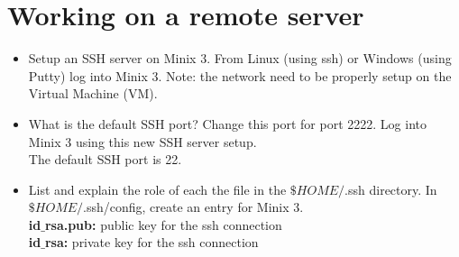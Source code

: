 \documentclass{article}
\begin{document}
\section{Working on a remote server}
\begin{itemize}
\item Setup an SSH server on Minix 3. From Linux (using ssh) or Windows (using Putty) log into Minix 3. Note: the network need to be properly setup on the Virtual Machine (VM).\\
\item What is the default SSH port? Change this port for port 2222. Log into Minix 3 using this new SSH server setup.\\
The default SSH port is 22.\\
\item List and explain the role of each the file in the $\$HOME/$.ssh directory. In $\$HOME/$.ssh/config, create an entry for Minix 3.\\
\textbf{id$\_$rsa.pub:} public key for the ssh connection\\
\textbf{id$\_$rsa:} private key for the ssh connection\\
\end{itemize}
\end{document}
